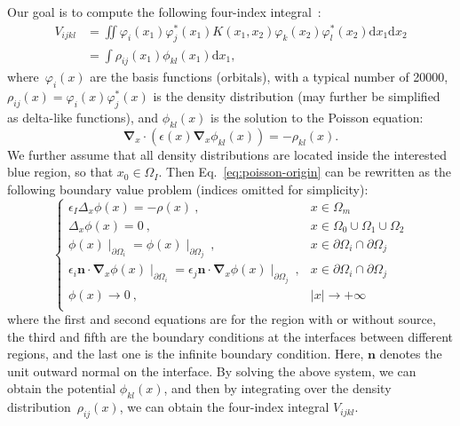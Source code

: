 \documentclass[prb,preprintnumbers,amsmath,amssymb, 10pt]{revtex4}
\newcommand{\M}[1]{\boldsymbol{#1}} %
\newcommand{\abs}[1]{\left|#1\right|} %
\newcommand{\grad}{\M{\nabla}} %
\begin{document}
Our goal is to compute the following four-index integral~\cite{cramer2013essentials}:
\begin{equation}
    \begin{split}
    V_{ijkl} &= \iint \varphi_i(x_1) \varphi_j^*(x_1) K(x_1, x_2) \varphi_k(x_2) \varphi_l^*(x_2) \mathrm{d}x_1 \mathrm{d}x_2\\
    & = \int \rho_{ij}(x_1) \phi_{kl}(x_1) \mathrm{d}x_1,
    \end{split}
\end{equation}
where~$\varphi_i(x)$ are the basis functions (orbitals), with a typical number of 20000,~$\rho_{ij}(x) = \varphi_i(x) \varphi_j^*(x)$ is the density distribution (may further be simplified as delta-like functions), and $\phi_{kl}(x)$ is the solution to the Poisson equation:
\begin{equation}\label{eq:poisson-origin}
    \grad_{x} \cdot \left( \epsilon(x) \grad_{x} \phi_{kl}(x) \right) = - \rho_{kl}(x).
\end{equation}
We further assume that all density distributions are located inside the interested blue region, so that $x_0 \in \Omega_I$.
Then Eq.~\eqref{eq:poisson-origin} can be rewritten as the following boundary value problem (indices omitted for simplicity):
\begin{equation}
    \begin{cases}
        \epsilon_I \Delta_{x} \phi(x) = - \rho(x)~, & x \in \Omega_m \\
        \Delta_{x} \phi(x) = 0~, & x \in \Omega_0 \cup \Omega_1 \cup \Omega_2 \\
        \phi(x)\mid_{\partial \Omega_i} = \phi(x)\mid_{\partial \Omega_j}~, & x \in \partial \Omega_i \cap \partial \Omega_j \\
        \epsilon_i \mathbf{n} \cdot \grad_{x} \phi(x)\mid_{\partial \Omega_i} = \epsilon_j \mathbf{n} \cdot \grad_{x} \phi(x)\mid_{\partial \Omega_j}~, & x \in \partial \Omega_i \cap \partial \Omega_j \\
        \phi(x) \to 0~, & \abs{x} \to + \infty \\
    \end{cases}
\end{equation}
where the first and second equations are for the region with or without source, the third and fifth are the boundary conditions at the interfaces between different regions, and the last one is the infinite boundary condition.
Here, $\mathbf{n}$ denotes the unit outward normal on the interface.
By solving the above system, we can obtain the potential $\phi_{kl}(x)$, and then by integrating over the density distribution~$\rho_{ij}(x)$, we can obtain the four-index integral $V_{ijkl}$.
\end{document}
